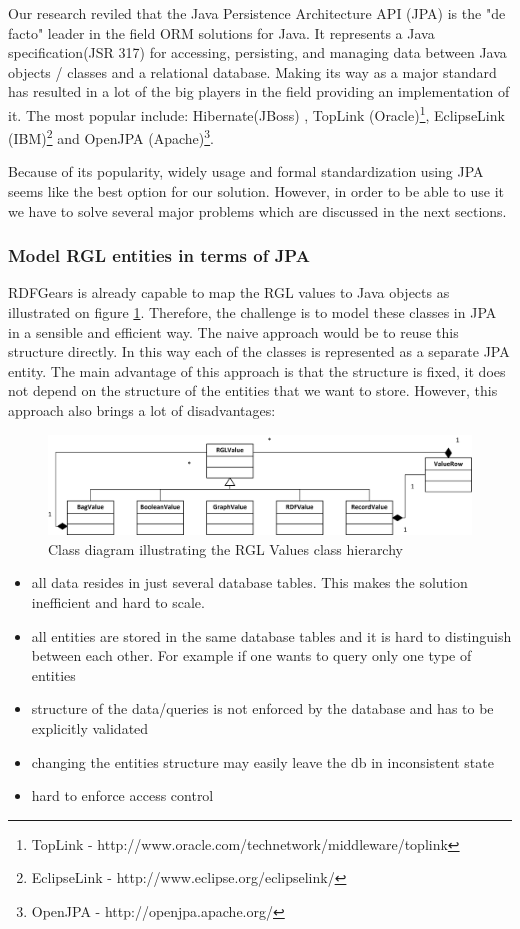 Our research reviled that the Java Persistence Architecture API (JPA) is the "de facto" leader in the field ORM solutions for Java. It represents a Java specification(JSR 317) for accessing, persisting, and managing data between Java objects / classes and a relational database. Making its way as a major standard has resulted in a lot of the big players in the field providing an implementation of it. The most popular include: Hibernate(JBoss) \cite{linwood2010beginning}, TopLink (Oracle)\footnote{TopLink - http://www.oracle.com/technetwork/middleware/toplink}, EclipseLink (IBM)\footnote{EclipseLink - http://www.eclipse.org/eclipselink/} and OpenJPA (Apache)\footnote{OpenJPA - http://openjpa.apache.org/}. 

Because of its popularity, widely usage and formal standardization using JPA seems like the best option for our solution. However, in order to be able to use it we have to solve several major problems which are discussed in the next sections.


\subsubsection{Model RGL entities in terms of JPA}
RDFGears is already capable to map the RGL values to Java objects as illustrated on figure \ref{fig_rglValuesClassDiag}. Therefore, the challenge is to model these classes in JPA in a sensible and efficient way. The naive approach would be to reuse this structure directly. In this way each of the classes is represented as a separate JPA entity. The main advantage of this approach is that the structure is fixed, it does not depend on the structure of the entities that we want to store. However, this approach also brings a lot of disadvantages: 

\begin{figure}[h!]
  \centering
  	\includegraphics[scale=0.8]{storage/diagrams/RGLValues.png}
  \caption{Class diagram illustrating the RGL Values class hierarchy}
  \label{fig_rglValuesClassDiag}
\end{figure}

\begin{itemize}
	\item all data resides in just several database tables. This makes the solution inefficient and hard to scale.
	\item all entities are stored in the same database tables and it is hard to distinguish between each other. For example if one wants to query only one type of entities
	\item structure of the data/queries is not enforced by the database and has to be explicitly validated
	\item changing the entities structure may easily leave the db in inconsistent state
	\item hard to enforce access control
\end{itemize}

